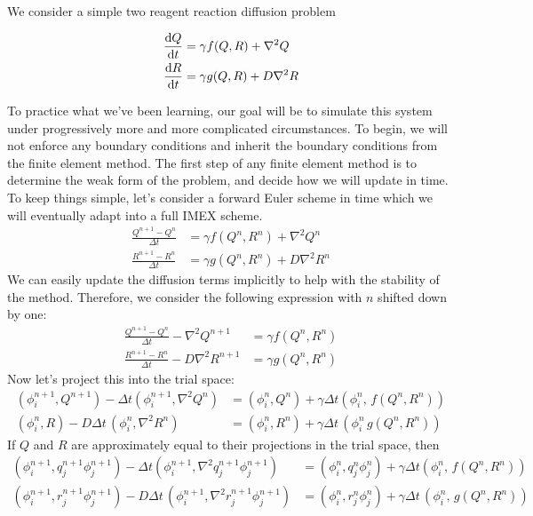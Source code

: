 \documentclass{article}
\begin{document}
We consider a simple two reagent reaction diffusion problem

\begin{align}
    \diff{Q}{t} &= \gamma f(Q,R) + \nabla^2 Q\\
    \diff{R}{t} &= \gamma g(Q,R) + D\nabla^2 R
\end{align}

To practice what we've been learning, our goal will be to simulate this system
under progressively more and more complicated circumstances. To begin, we will
not enforce any boundary conditions and inherit the boundary conditions from
the finite element method. The first step of any finite element method is to 
determine the weak form of the problem, and decide how we will update in time.
To keep things simple, let's consider a forward Euler scheme in time which we 
will eventually adapt into a full IMEX scheme.
\begin{align}
    \frac{Q^{n+1}-Q^n}{\Delta t} &= \gamma f(Q^n, R^n) + \nabla^2 Q^n\\
    \frac{R^{n+1}-R^n}{\Delta t} &= \gamma g(Q^n, R^n) + D\nabla^2 R^n
\end{align}
We can easily update the diffusion terms implicitly to help with the stability
of the method. Therefore, we consider the following expression with $n$ shifted
down by one:
\begin{align}
    \frac{Q^{n+1}-Q^{n}}{\Delta t} - \nabla^2 Q^{n+1}  &= \gamma f(Q^{n}, R^{n})\\
    \frac{R^{n+1}-R^{n}}{\Delta t} - D\nabla^2 R^{n+1} &= \gamma g(Q^{n}, R^{n})
\end{align}
Now let's project this into the trial space:
\begin{align}
    (\phi_i^{n+1}, Q^{n+1}) - \Delta t (\phi_i^{n+1}, \nabla^2 Q^n)
    &= (\phi_i^n, Q^{n}) + \gamma \Delta t (\phi_i^{n},\, f(Q^{n}, R^{n}))\\
    (\phi_i^n, R) - D\Delta t\, (\phi_i^n,\nabla^2 R^n)
    &= (\phi_i^n, R^{n}) + \gamma \Delta t\, (\phi_i^{n}\, g(Q^{n}, R^{n}))
\end{align}
If $Q$ and $R$ are approximately equal to their projections in the trial space,
then
\begin{align}
    (\phi_i^{n+1}, q_j^{n+1}\phi_j^{n+1}) - \Delta t (\phi_i^{n+1}, \nabla^2 q_j^{n+1} \phi_j^{n+1})
    &= (\phi_i^{n}, q_j^{n}\phi_j^{n}) + \gamma \Delta t (\phi_i^{n},\, f(Q^{n}, R^{n}))\\
    (\phi_i^{n+1}, r_j^{n+1} \phi_j^{n+1}) - D\Delta t\, (\phi_i^{n+1},\nabla^2 r_j^{n+1}\phi_j^{n+1})
    &= (\phi_i^n, r_j^{n}\phi_j^{n}) + \gamma \Delta t\, (\phi_i^{n},\, g(Q^{n}, R^{n}))
\end{align}
\end{document}
